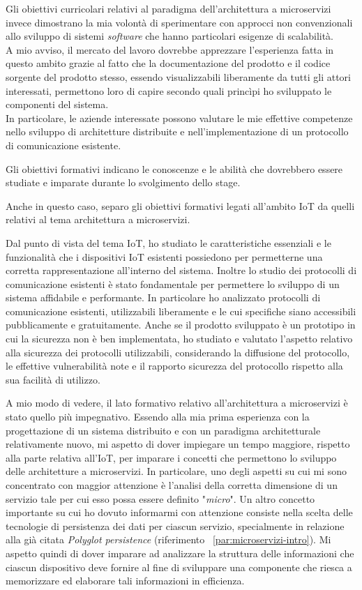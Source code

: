 Gli obiettivi curricolari relativi al paradigma dell'architettura a microservizi invece dimostrano la mia volontà di sperimentare con approcci non convenzionali allo sviluppo di sistemi \emph{software} che hanno particolari esigenze di scalabilità. \\
A mio avviso, il mercato del lavoro dovrebbe apprezzare l'esperienza fatta in questo ambito grazie al fatto che la documentazione del prodotto e il codice sorgente del prodotto stesso, essendo visualizzabili liberamente da tutti gli attori interessati, permettono loro di capire secondo quali princìpi ho sviluppato le componenti del sistema. \\
In particolare, le aziende interessate possono valutare le mie effettive competenze nello sviluppo di architetture distribuite e nell'implementazione di un protocollo di comunicazione esistente.


Gli obiettivi formativi indicano le conoscenze e le abilità che dovrebbero essere studiate e imparate durante lo svolgimento dello stage.

Anche in questo caso, separo gli obiettivi formativi legati all'ambito IoT da quelli relativi al tema architettura a microservizi.

Dal punto di vista del tema IoT, ho studiato le caratteristiche essenziali e le funzionalità che i dispositivi IoT esistenti possiedono per permetterne una corretta rappresentazione all'interno del sistema.
Inoltre lo studio dei protocolli di comunicazione esistenti è stato fondamentale per permettere lo sviluppo di un sistema affidabile e performante. In particolare ho analizzato protocolli di comunicazione esistenti, utilizzabili liberamente e le cui specifiche siano accessibili pubblicamente e gratuitamente.
Anche se il prodotto sviluppato è un prototipo in cui la sicurezza non è ben implementata, ho studiato e valutato l'aspetto relativo alla sicurezza dei protocolli utilizzabili, considerando la diffusione del protocollo, le effettive vulnerabilità note e il rapporto sicurezza del protocollo rispetto alla sua facilità di utilizzo.

A mio modo di vedere, il lato formativo relativo all'architettura a microservizi è stato quello più impegnativo.
Essendo alla mia prima esperienza con la progettazione di un sistema distribuito e con un paradigma architetturale relativamente nuovo, mi aspetto di dover impiegare un tempo maggiore, rispetto alla parte relativa all'IoT, per imparare i concetti che permettono lo sviluppo delle architetture a microservizi.
In particolare, uno degli aspetti su cui mi sono concentrato con maggior attenzione è l'analisi della corretta dimensione di un servizio tale per cui esso possa essere definito "\emph{micro}".
Un altro concetto importante su cui ho dovuto informarmi con attenzione consiste nella scelta delle tecnologie di persistenza dei dati per ciascun servizio, specialmente in relazione alla già citata \emph{Polyglot persistence} (riferimento ~\ref{par:microservizi-intro}).
Mi aspetto quindi di dover imparare ad analizzare la struttura delle informazioni che ciascun dispositivo deve fornire al fine di sviluppare una componente che riesca a memorizzare ed elaborare tali informazioni in efficienza.


